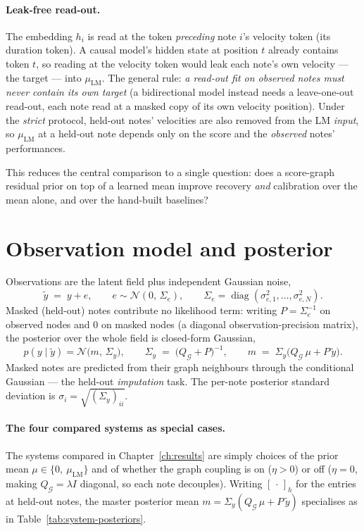 \documentclass[11pt,a4paper]{report}
\newcommand{\N}{\mathcal{N}}
\newcommand{\graph}{\mathcal{G}}
\newcommand{\Qg}{Q_{\graph}}
\newcommand{\muLM}{\mu_{\mathrm{LM}}}  %
\newcommand{\Sy}{\Sigma_y}             %
\newcommand{\diag}{\operatorname{diag}}
\begin{document}
\paragraph{Leak-free read-out.}
The embedding $h_i$ is read at the token \emph{preceding} note $i$'s velocity token
(its duration token). A causal model's hidden state at position $t$ already contains
token $t$, so reading at the velocity token would leak each note's own velocity ---
the target --- into $\muLM$. The general rule: \emph{a read-out fit on observed
notes must never contain its own target} (a bidirectional model instead needs a
leave-one-out read-out, each note read at a masked copy of its own velocity
position). Under the \emph{strict} protocol, held-out notes' velocities are also
removed from the LM \emph{input}, so $\muLM$ at a held-out note depends only on the
score and the \emph{observed} notes' performances.

\medskip\noindent
This reduces the central comparison to a single question: does a score-graph
residual prior on top of a learned mean improve recovery \emph{and} calibration over
the mean alone, and over the hand-built baselines?

\section{Observation model and posterior}
\label{sec:posterior}
Observations are the latent field plus independent Gaussian noise,
\begin{equation}
  \tilde y \;=\; y + e, \qquad e \sim \N(0,\, \Sigma_e),
  \qquad \Sigma_e = \diag(\sigma_{e,1}^2, \dots, \sigma_{e,N}^2).
  \label{eq:obs}
\end{equation}
Masked (held-out) notes contribute no likelihood term: writing $P = \Sigma_e^{-1}$
on observed nodes and $0$ on masked nodes (a diagonal observation-precision matrix),
the posterior over the whole field is closed-form Gaussian,
\begin{equation}
  p(y \mid \tilde y) = \N\bigl(m,\, \Sy\bigr), \qquad
  \Sy \;=\; \bigl(\Qg + P\bigr)^{-1}, \qquad
  m \;=\; \Sy \bigl(\Qg\, \mu + P\, \tilde y\bigr).
  \label{eq:posterior}
\end{equation}
Masked notes are predicted from their graph neighbours through the conditional
Gaussian --- the held-out \emph{imputation} task. The per-note posterior standard
deviation is $\sigma_i = \sqrt{(\Sy)_{ii}}$.

\paragraph{The four compared systems as special cases.}
The systems compared in Chapter~\ref{ch:results} are simply choices of the prior
mean $\mu \in \{0,\ \muLM\}$ and of whether the graph coupling is on ($\eta > 0$) or
off ($\eta = 0$, making $\Qg = \lambda I$ diagonal, so each note decouples). Writing
$[\,\cdot\,]_h$ for the entries at held-out notes, the master posterior mean
$m = \Sy(\Qg\,\mu + P\,\tilde y)$ specialises as in
Table~\ref{tab:system-posteriors}.
\end{document}
